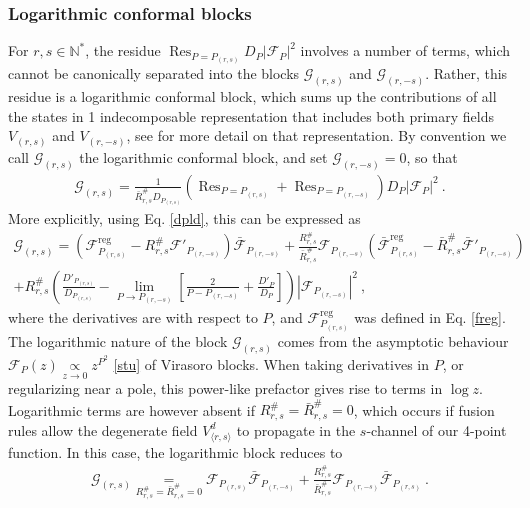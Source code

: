 \documentclass[12pt, a4paper]{article}
\theoremstyle{break}
\begin{document}
\subsubsection{Logarithmic conformal blocks}\label{sec:log}

For $r,s\in\mathbb{N}^*$, the residue $\operatorname{Res}_{P=P_{(r,s)}}D_P\left|\mathcal{F}_{P}\right|^2$ 
involves a number of terms, which cannot be canonically separated into the blocks 
$\mathcal{G}_{(r,s)}$ and $\mathcal{G}_{(r,-s)}$. Rather, this residue is a logarithmic conformal block, which sums up the contributions of all the states in 1 indecomposable representation that includes both primary fields $V_{(r,s)}$ and $V_{(r,-s)}$, see \cite{nr20} for more detail on that representation. By convention we call $\mathcal{G}_{(r,s)}$ the logarithmic conformal block, and set $\mathcal{G}_{(r,-s)}=0$, so that 
\begin{align}
 \mathcal{G}_{(r,s)} = \frac{1}{\bar R^{\#}_{r,s} D_{P_{(r,s)}}} \left( \operatorname{Res}_{P=P_{(r,s)}} + \operatorname{Res}_{P=P_{(r,-s)}}\right)D_P\left|\mathcal{F}_{P}\right|^2 \ . 
\end{align}
More explicitly, using Eq. \eqref{dpld}, this can be expressed as 
\begin{multline}
  \mathcal{G}_{(r,s)} = \left(\mathcal{F}^\text{reg}_{P_{(r,s)}} -R^{\#}_{r,s} \mathcal{F}'_{P_{(r,-s)}}\right) \bar{\mathcal{F}}_{P_{(r,-s)}} 
  + \frac{R^{\#}_{r,s}}{\bar{R}^{\#}_{r,s}} \mathcal{F}_{P_{(r,-s)}} \left(\bar{\mathcal{F}}^\text{reg}_{P_{(r,s)}} -\bar R^{\#}_{r,s} \bar{\mathcal{F}}'_{P_{(r,-s)}}\right)
  \\
  + R^{\#}_{r,s} \left( \frac{D'_{P_{(r,s)}}}{D_{P_{(r,s)}}} - \lim_{P\to P_{(r,-s)}}\left[\frac{2}{P-P_{(r,-s)}} +\frac{D'_P}{D_P}\right]\right)
  \left|\mathcal{F}_{P_{(r,-s)}}\right|^2 
  \ ,
\end{multline}
where the derivatives are with respect to $P$, and
$\mathcal{F}^\text{reg}_{P_{(r,s)}}$ was defined in Eq. \eqref{freg}.
The logarithmic nature of the block $\mathcal{G}_{(r,s)}$ comes from the asymptotic behaviour $\mathcal{F}_P(z)\underset{z\to 0}{\propto} z^{P^2} $ \eqref{stu} of Virasoro blocks. When taking derivatives in $P$, or regularizing near a pole, this power-like prefactor gives rise to terms in $\log z$. Logarithmic terms are however absent if $R^{\#}_{r,s}=\bar R^{\#}_{r,s}=0$, which occurs if fusion rules allow the degenerate field $V^d_{\langle r,s\rangle}$ to propagate in the $s$-channel of our 4-point function. In this case, the logarithmic block reduces to 
\begin{align}
 \mathcal{G}_{(r,s)} \underset{R^{\#}_{r,s}=\bar R^{\#}_{r,s}=0}{=} 
 \mathcal{F}_{P_{(r,s)}}  \bar{\mathcal{F}}_{P_{(r,-s)}} + 
 \frac{R^{\#}_{r,s}}{\bar{R}^{\#}_{r,s}} \mathcal{F}_{P_{(r,-s)}} \bar{\mathcal{F}}_{P_{(r,s)}} \ .
\end{align}
\end{document}
